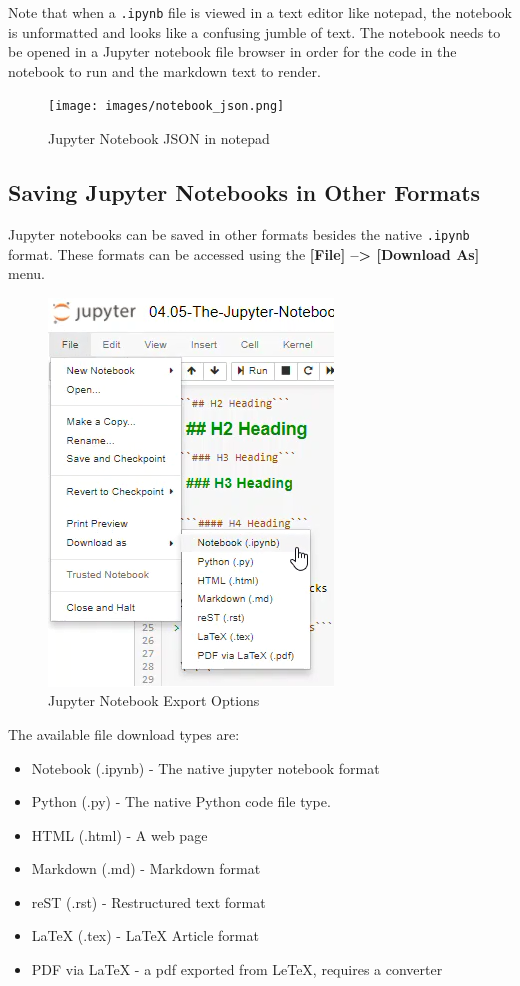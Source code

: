 \documentclass{book}
\makeatletter
\def\maxwidth{\ifdim\Gin@nat@width>\linewidth\linewidth
    \else\Gin@nat@width\fi}
\let\Oldincludegraphics\includegraphics
\renewcommand{\includegraphics}[1]{\Oldincludegraphics[width=.8\maxwidth]{#1}}
\providecommand{\tightlist}{%
      \setlength{\itemsep}{0pt}\setlength{\parskip}{0pt}}
\makeatother
\begin{document}
Note that when a \lstinline!.ipynb! file is viewed in a text editor like
notepad, the notebook is unformatted and looks like a confusing jumble
of text. The notebook needs to be opened in a Jupyter notebook file
browser in order for the code in the notebook to run and the markdown
text to render.

\begin{figure}
\centering
\texttt{[image: images/notebook\_json.png]}
\caption{Jupyter Notebook JSON in notepad}
\end{figure}
    




    
        \subsection{Saving Jupyter Notebooks in Other
Formats}\label{saving-jupyter-notebooks-in-other-formats}

Jupyter notebooks can be saved in other formats besides the native
\lstinline!.ipynb! format. These formats can be accessed using the
\textbf{{[}File{]} --\textgreater{} {[}Download As{]}} menu.

\begin{figure}
\centering
\includegraphics{images/jupyter_notebook_export_options.png}
\caption{Jupyter Notebook Export Options}
\end{figure}

The available file download types are:

\begin{itemize}
\tightlist
\item
  Notebook (.ipynb) - The native jupyter notebook format
\item
  Python (.py) - The native Python code file type.
\item
  HTML (.html) - A web page
\item
  Markdown (.md) - Markdown format
\item
  reST (.rst) - Restructured text format
\item
  LaTeX (.tex) - LaTeX Article format
\item
  PDF via LaTeX - a pdf exported from LeTeX, requires a converter
\end{itemize}
\end{document}
